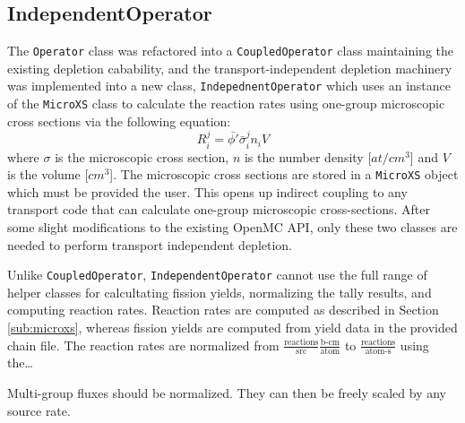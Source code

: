     \subsection{IndependentOperator}
        The \verb.Operator. class was refactored into a \verb.CoupledOperator.
        class maintaining the existing depletion cabability, and the
        transport-independent depletion machinery was implemented into a new
        class, \verb.IndepednentOperator. which uses an instance of the
        \verb.MicroXS. class to calculate the reaction rates using one-group
        microscopic cross sections via the following equation:
        \begin{equation}
            R^j_i = \bar{\phi'} \bar{\sigma}^j_i n_i V
        \end{equation}
        where $\sigma$ is the microscopic cross section, $n$ is the number
        density [$at/cm^3$] and $V$ is the volume [$cm^3$]. The microscopic
        cross sections are stored in a \verb.MicroXS. object which must be
        provided the user. This opens up indirect coupling to any transport code
        that can calculate one-group microscopic cross-sections. After some
        slight modifications to the existing OpenMC API, only these two classes
        are needed to perform transport independent depletion.

        Unlike \verb.CoupledOperator., \verb.IndependentOperator. cannot use the
        full range of helper classes for calcultating fission yields,
        normalizing the tally results, and computing reaction rates. Reaction
        rates are computed as described in Section \ref{sub:microxs}, whereas
        fission yields are computed from yield data in the provided chain file.
        The reaction rates are normalized from
        $\frac{\text{reactions}}{\text{src}}\frac{\text{b-cm}}{\text{atom}}$ to
        $\frac{\text{reactions}}{\text{atom-s}}$ using the\ldots
        

        Multi-group fluxes should be normalized. They can then be freely scaled
        by any source rate.

